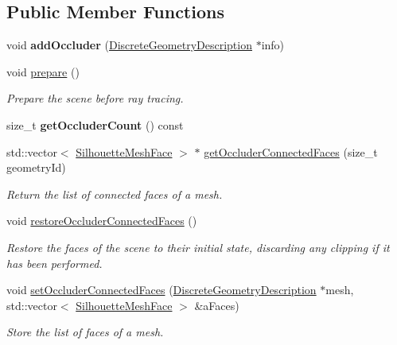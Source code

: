 \subsection*{Public Member Functions}
\begin{DoxyCompactItemize}
\item 
\mbox{\label{classvisilib_1_1_geometry_occluder_set_a0d3103cdce2ceff0f68949f64ec5607f}} 
void {\bfseries add\+Occluder} (\mbox{\hyperlink{structvisilib_1_1_discrete_geometry_description}{Discrete\+Geometry\+Description}} $\ast$info)
\item 
\mbox{\label{classvisilib_1_1_geometry_occluder_set_a9ad0f12014c07ed08cdd6be981faf704}} 
void \mbox{\hyperlink{classvisilib_1_1_geometry_occluder_set_a9ad0f12014c07ed08cdd6be981faf704}{prepare}} ()
\begin{DoxyCompactList}\small\item\em Prepare the scene before ray tracing. \end{DoxyCompactList}\item 
\mbox{\label{classvisilib_1_1_geometry_occluder_set_a6b4c7066a4ef012501748501f3d2febc}} 
size\+\_\+t {\bfseries get\+Occluder\+Count} () const
\item 
std\+::vector$<$ \mbox{\hyperlink{classvisilib_1_1_silhouette_mesh_face}{Silhouette\+Mesh\+Face}} $>$ $\ast$ \mbox{\hyperlink{classvisilib_1_1_geometry_occluder_set_a48bcbc4a98511777faf8fa006343d6a3}{get\+Occluder\+Connected\+Faces}} (size\+\_\+t geometry\+Id)
\begin{DoxyCompactList}\small\item\em Return the list of connected faces of a mesh. \end{DoxyCompactList}\item 
\mbox{\label{classvisilib_1_1_geometry_occluder_set_a01d2de1cfec62e4000ca3b5b262ae4bb}} 
void \mbox{\hyperlink{classvisilib_1_1_geometry_occluder_set_a01d2de1cfec62e4000ca3b5b262ae4bb}{restore\+Occluder\+Connected\+Faces}} ()
\begin{DoxyCompactList}\small\item\em Restore the faces of the scene to their initial state, discarding any clipping if it has been performed. \end{DoxyCompactList}\item 
void \mbox{\hyperlink{classvisilib_1_1_geometry_occluder_set_a4700b3241185a0c1064a2a227d771d99}{set\+Occluder\+Connected\+Faces}} (\mbox{\hyperlink{structvisilib_1_1_discrete_geometry_description}{Discrete\+Geometry\+Description}} $\ast$mesh, std\+::vector$<$ \mbox{\hyperlink{classvisilib_1_1_silhouette_mesh_face}{Silhouette\+Mesh\+Face}} $>$ \&a\+Faces)
\begin{DoxyCompactList}\small\item\em Store the list of faces of a mesh. \end{DoxyCompactList}\end{DoxyCompactItemize}
